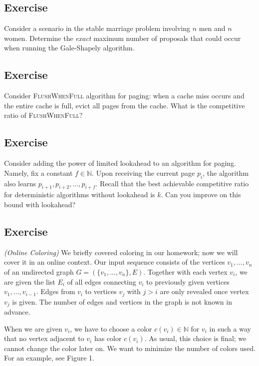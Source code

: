 \documentclass[14pt]{extreport}
\newcounter{counter}
\newcommand{\Exercise}{Exercise \stepcounter{counter}\thecounter}
\begin{document}
\subsection*{\Exercise}
    Consider a scenario in the stable marriage problem involving $n$ men and $n$ women. Determine the \textit{exact} maximum number of proposals that could occur when running the Gale-Shapely algorithm.

\subsection*{\Exercise}
    Consider \textsc{FlushWhenFull} algorithm for paging: when a cache miss occurs and the entire cache is full, evict all pages from the cache. What is  the competitive ratio of \textsc{FlushWhenFull}?
    
\subsection*{\Exercise}    
    Consider adding the power of limited lookahead to an algorithm for paging. Namely, fix a constant $f \in \mathbb{N}$. Upon receiving the current page $p_i$, the algorithm also learns $p_{i+1}, p_{i+2}, \dots, p_{i+f}$. Recall that the best achievable competitive ratio for deterministic algorithms without lookahead is $k$. Can you improve on this bound with lookahead?

\subsection*{\Exercise}
    \textit{(Online Coloring)} We briefly covered coloring in our homework; now we will cover it in an online context. Our input sequence consists of the vertices $v_1, \ldots, v_n$ of an undirected graph $G = (\{v_1, \ldots, v_n\}, E)$. Together with each vertex $v_i$, we are given the list $E_i$ of all edges connecting $v_i$ to previously given vertices $v_1, \ldots, v_{i-1}$. Edges from $v_i$ to vertices $v_j$ with $j > i$ are only revealed once vertex $v_j$ is given. The number of edges and vertices in the graph is not known in advance.

    \vspace{5mm}
    When we are given $v_i$, we have to choose a color $c(v_i) \in \mathbb{N}$ for $v_i$ in such a way that no vertex adjacent to $v_i$ has color $c(v_i)$. As usual, this choice is final; we cannot change the color later on. We want to minimize the number of colors used. For an example, see Figure 1.
\end{document}
